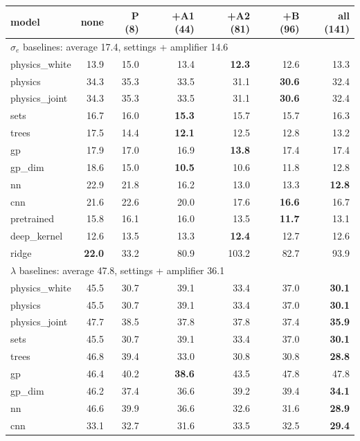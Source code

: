 \begin{tabular}{lrrrrrr}
\toprule
model & none & P (8) & +A1 (44) & +A2 (81) & +B (96) & all (141) \\
\midrule
\multicolumn{7}{l}{\textbf{$\sigma_e$} \quad baselines: average 17.4, settings + amplifier 14.6} \\ \midrule
physics\_white & 13.9 & 15.0 & 13.4 & \textbf{12.3} & 12.6 & 13.3 \\
physics & 34.3 & 35.3 & 33.5 & 31.1 & \textbf{30.6} & 32.4 \\
physics\_joint & 34.3 & 35.3 & 33.5 & 31.1 & \textbf{30.6} & 32.4 \\
sets & 16.7 & 16.0 & \textbf{15.3} & 15.7 & 15.7 & 16.3 \\
trees & 17.5 & 14.4 & \textbf{12.1} & 12.5 & 12.8 & 13.2 \\
gp & 17.9 & 17.0 & 16.9 & \textbf{13.8} & 17.4 & 17.4 \\
gp\_dim & 18.6 & 15.0 & \textbf{10.5} & 10.6 & 11.8 & 12.8 \\
nn & 22.9 & 21.8 & 16.2 & 13.0 & 13.3 & \textbf{12.8} \\
cnn & 21.6 & 22.6 & 20.0 & 17.6 & \textbf{16.6} & 16.7 \\
pretrained & 15.8 & 16.1 & 16.0 & 13.5 & \textbf{11.7} & 13.1 \\
deep\_kernel & 12.6 & 13.5 & 13.3 & \textbf{12.4} & 12.7 & 12.6 \\
ridge & \textbf{22.0} & 33.2 & 80.9 & 103.2 & 82.7 & 93.9 \\
\midrule
\multicolumn{7}{l}{\textbf{$\lambda$} \quad baselines: average 47.8, settings + amplifier 36.1} \\ \midrule
physics\_white & 45.5 & 30.7 & 39.1 & 33.4 & 37.0 & \textbf{30.1} \\
physics & 45.5 & 30.7 & 39.1 & 33.4 & 37.0 & \textbf{30.1} \\
physics\_joint & 47.7 & 38.5 & 37.8 & 37.8 & 37.4 & \textbf{35.9} \\
sets & 45.5 & 30.7 & 39.1 & 33.4 & 37.0 & \textbf{30.1} \\
trees & 46.8 & 39.4 & 33.0 & 30.8 & 30.8 & \textbf{28.8} \\
gp & 46.4 & 40.2 & \textbf{38.6} & 43.5 & 47.8 & 47.8 \\
gp\_dim & 46.2 & 37.4 & 36.6 & 39.2 & 39.4 & \textbf{34.1} \\
nn & 46.6 & 39.9 & 36.6 & 32.6 & 31.6 & \textbf{28.9} \\
cnn & 33.1 & 32.7 & 31.6 & 33.5 & 32.5 & \textbf{29.4} \\

\end{tabular}
